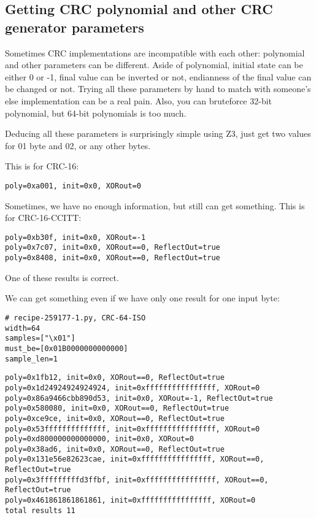 \subsection{Getting CRC polynomial and other CRC generator parameters}

Sometimes CRC implementations are incompatible with each other: polynomial and other parameters can be different.
Aside of polynomial, initial state can be either 0 or -1, final value can be inverted or not, endianness of the final value can be changed or not.
Trying all these parameters by hand to match with someone's else implementation can be a real pain.
Also, you can bruteforce 32-bit polynomial, but 64-bit polynomials is too much.

Deducing all these parameters is surprisingly simple using Z3, just get two values for 01 byte and 02, or any other bytes.



This is for CRC-16:

\begin{lstlisting}
poly=0xa001, init=0x0, XORout=0
\end{lstlisting}

Sometimes, we have no enough information, but still can get something. This is for CRC-16-CCITT:

\begin{lstlisting}
poly=0xb30f, init=0x0, XORout=-1
poly=0x7c07, init=0x0, XORout==0, ReflectOut=true
poly=0x8408, init=0x0, XORout==0, ReflectOut=true
\end{lstlisting}

One of these results is correct.

We can get something even if we have only one result for one input byte:

\begin{lstlisting}
# recipe-259177-1.py, CRC-64-ISO
width=64
samples=["\x01"]
must_be=[0x01B0000000000000]
sample_len=1
\end{lstlisting}

\begin{lstlisting}
poly=0x1fb12, init=0x0, XORout==0, ReflectOut=true
poly=0x1d24924924924924, init=0xffffffffffffffff, XORout=0
poly=0x86a9466cbb890d53, init=0x0, XORout=-1, ReflectOut=true
poly=0x580080, init=0x0, XORout==0, ReflectOut=true
poly=0xce9ce, init=0x0, XORout==0, ReflectOut=true
poly=0x53ffffffffffffff, init=0xffffffffffffffff, XORout=0
poly=0xd800000000000000, init=0x0, XORout=0
poly=0x38ad6, init=0x0, XORout==0, ReflectOut=true
poly=0x131e56e82623cae, init=0xffffffffffffffff, XORout==0, ReflectOut=true
poly=0x3fffffffffd3ffbf, init=0xffffffffffffffff, XORout==0, ReflectOut=true
poly=0x461861861861861, init=0xffffffffffffffff, XORout=0
total results 11
\end{lstlisting}

